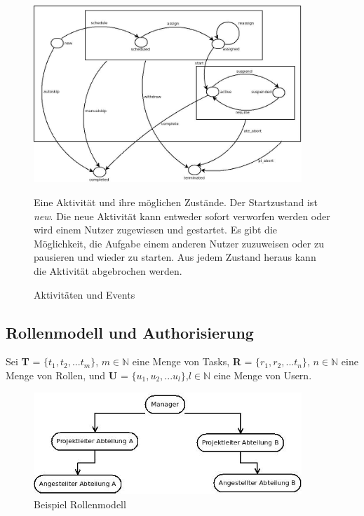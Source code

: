 \begin{figure}[ht]
	\centering
  \includegraphics[width=0.9\textwidth]{Figures/Taskevents}
	\caption{Aktivitäten und Events}
Eine Aktivität und ihre möglichen Zustände. Der Startzustand ist \textit{new}. Die neue Aktivität kann entweder sofort verworfen werden oder wird einem Nutzer zugewiesen und gestartet. Es gibt die Möglichkeit, die Aufgabe einem anderen Nutzer zuzuweisen oder zu pausieren und wieder zu starten. Aus jedem Zustand heraus kann die Aktivität abgebrochen werden.
	\label{fig2}
\end{figure}
 

\subsection{Rollenmodell und Authorisierung}
Sei \textbf{T} = $\{t_1,t_2,...t_m\}$, $m\in\mathbb{N}$ eine Menge von Tasks, \textbf{R} = $\{r_1,r_2,...t_n\}$, $n\in\mathbb{N}$ eine Menge von Rollen, und \textbf{U} = $\{u_1,u_2,...u_l\}$,$l\in\mathbb{N}$ eine Menge von Usern.

\begin{figure}[ht]
	\centering
  \includegraphics[width=0.9\textwidth]{Figures/Rollenmodell}
	\caption{Beispiel Rollenmodell}
	\label{fig:examplerolemodel}
\end{figure}

